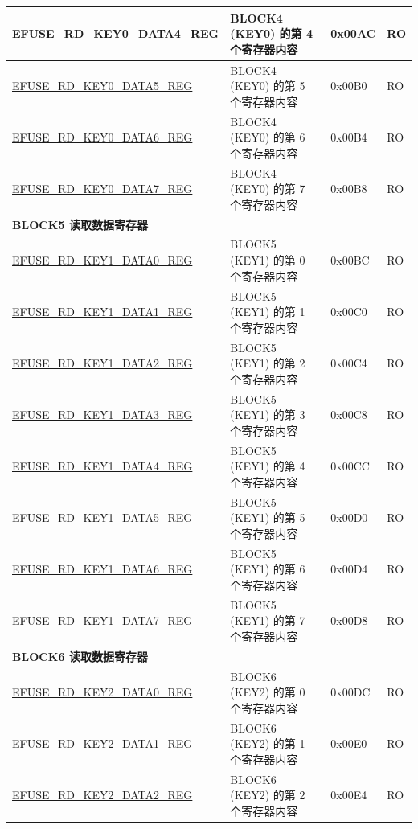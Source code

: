 \begin{longtable}{ | p{7cm} | p{7.2cm} | p{1.3cm} | p{1cm} | }
\hyperref[regdesc:EFUSERDKEY0DATANREG]{EFUSE\_RD\_KEY0\_DATA4\_REG} & BLOCK4 (KEY0) 的第 4 个寄存器内容 & 0x00AC & RO \\ \hline
\hyperref[regdesc:EFUSERDKEY0DATANREG]{EFUSE\_RD\_KEY0\_DATA5\_REG} & BLOCK4 (KEY0) 的第 5 个寄存器内容 & 0x00B0 & RO \\ \hline
\hyperref[regdesc:EFUSERDKEY0DATANREG]{EFUSE\_RD\_KEY0\_DATA6\_REG} & BLOCK4 (KEY0) 的第 6 个寄存器内容 & 0x00B4 & RO \\ \hline
\hyperref[regdesc:EFUSERDKEY0DATANREG]{EFUSE\_RD\_KEY0\_DATA7\_REG} & BLOCK4 (KEY0) 的第 7 个寄存器内容 & 0x00B8 & RO \\ \hline
\multicolumn{4}{|l|}{\textbf{BLOCK5 读取数据寄存器}} \\ \hline
\hyperref[regdesc:EFUSERDKEY1DATANREG]{EFUSE\_RD\_KEY1\_DATA0\_REG} & BLOCK5 (KEY1) 的第 0 个寄存器内容 & 0x00BC & RO \\ \hline
\hyperref[regdesc:EFUSERDKEY1DATANREG]{EFUSE\_RD\_KEY1\_DATA1\_REG} & BLOCK5 (KEY1) 的第 1 个寄存器内容 & 0x00C0 & RO \\ \hline
\hyperref[regdesc:EFUSERDKEY1DATANREG]{EFUSE\_RD\_KEY1\_DATA2\_REG} & BLOCK5 (KEY1) 的第 2 个寄存器内容 & 0x00C4 & RO \\ \hline
\hyperref[regdesc:EFUSERDKEY1DATANREG]{EFUSE\_RD\_KEY1\_DATA3\_REG} & BLOCK5 (KEY1) 的第 3 个寄存器内容 & 0x00C8 & RO \\ \hline
\hyperref[regdesc:EFUSERDKEY1DATANREG]{EFUSE\_RD\_KEY1\_DATA4\_REG} & BLOCK5 (KEY1) 的第 4 个寄存器内容 & 0x00CC & RO \\ \hline
\hyperref[regdesc:EFUSERDKEY1DATANREG]{EFUSE\_RD\_KEY1\_DATA5\_REG} & BLOCK5 (KEY1) 的第 5 个寄存器内容 & 0x00D0 & RO \\ \hline
\hyperref[regdesc:EFUSERDKEY1DATANREG]{EFUSE\_RD\_KEY1\_DATA6\_REG} & BLOCK5 (KEY1) 的第 6 个寄存器内容 & 0x00D4 & RO \\ \hline
\hyperref[regdesc:EFUSERDKEY1DATANREG]{EFUSE\_RD\_KEY1\_DATA7\_REG} & BLOCK5 (KEY1) 的第 7 个寄存器内容 & 0x00D8 & RO \\ \hline
\multicolumn{4}{|l|}{\textbf{BLOCK6 读取数据寄存器}} \\ \hline
\hyperref[regdesc:EFUSERDKEY2DATANREG]{EFUSE\_RD\_KEY2\_DATA0\_REG} & BLOCK6 (KEY2) 的第 0 个寄存器内容 & 0x00DC & RO \\ \hline
\hyperref[regdesc:EFUSERDKEY2DATANREG]{EFUSE\_RD\_KEY2\_DATA1\_REG} & BLOCK6 (KEY2) 的第 1 个寄存器内容 & 0x00E0 & RO \\ \hline
\hyperref[regdesc:EFUSERDKEY2DATANREG]{EFUSE\_RD\_KEY2\_DATA2\_REG} & BLOCK6 (KEY2) 的第 2 个寄存器内容 & 0x00E4 & RO \\ \hline

\end{longtable}
